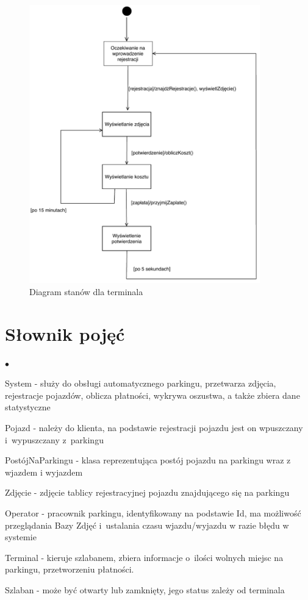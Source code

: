 \begin{figure}[H]
	\centering
	\includegraphics[width=100mm]{diagramy/DiagStanTerminal.pdf}
	\caption{Diagram stanów dla terminala}
\end{figure}




\section{Słownik pojęć}
\label{sec:slownik}

\begin{list}{$\bullet$}{}
\item System - służy do obsługi automatycznego parkingu, przetwarza zdjęcia, rejestracje pojazdów, oblicza płatności, wykrywa oszustwa, a także zbiera dane statystyczne
\item Pojazd - należy do klienta, na podstawie rejestracji pojazdu jest on wpuszczany i~wypuszczany z~parkingu
\item PostójNaParkingu - klasa reprezentująca postój pojazdu na parkingu wraz z wjazdem i wyjazdem
\item Zdjęcie - zdjęcie tablicy rejestracyjnej pojazdu znajdującego się na parkingu
\item Operator - pracownik parkingu, identyfikowany na podstawie Id, ma możliwość przeglądania Bazy Zdjęć i~ustalania czasu wjazdu/wyjazdu w razie błędu w systemie
\item Terminal - kieruje szlabanem, zbiera informacje o~ilości wolnych miejsc na parkingu, przetworzeniu płatności.
\item Szlaban - może być otwarty lub zamknięty, jego status zależy od terminala
\end{list}
